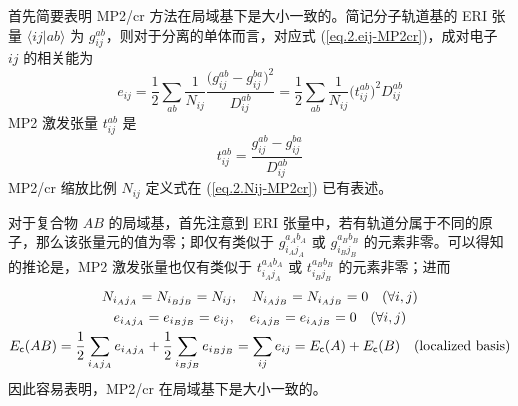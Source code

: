 首先简要表明 MP2/cr 方法在局域基下是大小一致的。简记分子轨道基的 ERI 张量 $\langle ij | ab \rangle$ 为 $g_{ij}^{ab}$，则对于分离的单体而言，对应式 (\ref{eq.2.eij-MP2cr})，成对电子 $ij$ 的相关能为
\begin{equation*}
  e_{ij} = \frac{1}{2} \sum_{ab} \frac{1}{N_{ij}} \frac{\big( g_{ij}^{ab} - g_{ij}^{ba} \big)^2}{D_{ij}^{ab}} = \frac{1}{2} \sum_{ab} \frac{1}{N_{ij}} \big( t_{ij}^{ab} \big)^2 D_{ij}^{ab}
\end{equation*}
MP2 激发张量 $t_{ij}^{ab}$ 是
\begin{equation*}
  t_{ij}^{ab} = \frac{g_{ij}^{ab} - g_{ij}^{ba}}{D_{ij}^{ab}}
\end{equation*}
MP2/cr 缩放比例 $N_{ij}$ 定义式在 (\ref{eq.2.Nij-MP2cr}) 已有表述。

对于复合物 $AB$ 的局域基，首先注意到 ERI 张量中，若有轨道分属于不同的原子，那么该张量元的值为零；即仅有类似于 $g_{i_A j_A}^{a_A b_A}$ 或 $g_{i_B j_B}^{a_B b_B}$ 的元素非零。可以得知的推论是，MP2 激发张量也仅有类似于 $t_{i_A j_A}^{a_A b_A}$ 或 $t_{i_B j_B}^{a_B b_B}$ 的元素非零；进而
\begin{gather*}
  N_{i_A j_A} = N_{i_B j_B} = N_{ij}, \quad N_{i_A j_B} = N_{i_A j_B} = 0 \quad (\forall i, j) \\
  e_{i_A j_A} = e_{i_B j_B} = e_{ij}, \quad e_{i_A j_B} = e_{i_A j_B} = 0 \quad (\forall i, j) \\
  E_{\textsf{c}} (AB) = \frac{1}{2} \sum_{i_A j_A} e_{i_A j_A} + \frac{1}{2} \sum_{i_B j_B} e_{i_B j_B} = \sum_{ij} e_{ij} = E_{\textsf{c}} (A) + E_{\textsf{c}} (B) \quad \text{(localized basis)}
\end{gather*}
因此容易表明，MP2/cr 在局域基下是大小一致的。

